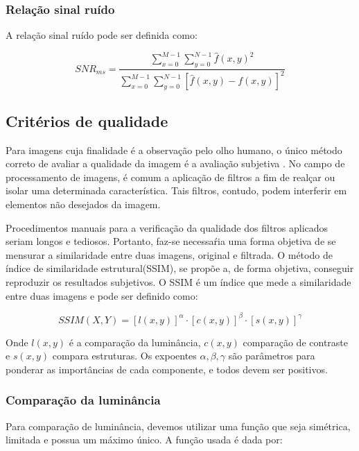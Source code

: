\documentclass[10pt,a4paper]{article}
\begin{document}
\subsubsection{Relação sinal ruído}
A relação sinal ruído pode ser definida como:

\begin{equation}
    SNR_{ms} =\frac{\sum_{x = 0}^{M - 1} \sum_{y = 0}^{N - 1} \hat{f}(x,y)^{2} }{\sum_{x = 0}^{M - 1} \sum_{y = 0}^{N - 1} [\hat{f}(x,y) - f(x,y)]^2}
    \label{eq:snr}
\end{equation}

\subsection{Critérios de qualidade}
Para imagens cuja finalidade é a observação pelo olho humano, o único método correto de avaliar a qualidade da imagem é a avaliação subjetiva \cite{article}. No campo de processamento de imagens, é comum a aplicação de filtros a fim de realçar ou isolar uma determinada característica. Tais filtros, contudo, podem interferir em elementos não desejados da imagem.

Procedimentos manuais para a verificação da qualidade dos filtros aplicados seriam longos e tediosos. Portanto, faz-se necessaŕia uma forma objetiva de se mensurar a similaridade entre duas imagens, original e filtrada. O método de índice de similaridade estrutural(SSIM), se propõe a, de forma objetiva, conseguir reproduzir os resultados subjetivos. O SSIM é um índice que mede a similaridade entre duas imagens e pode ser definido como:

\begin{equation}
    \mathit{SSIM}(X,Y) = [l(x,y)]^{\alpha} \cdot [c(x,y)]^{\beta} \cdot [s(x,y)]^{\gamma}
    \label{eq:ssim_trash}
\end{equation}

Onde $l(x,y)$ é a comparação da luminância, $c(x,y)$ comparação de contraste e $s(x,y)$ compara estruturas. Os expoentes $\alpha, \beta, \gamma$ são parâmetros para ponderar as importâncias de cada componente, e todos devem ser positivos.

\subsubsection*{Comparação da luminância}
Para comparação de luminância, devemos utilizar uma função que seja simétrica, limitada e possua um máximo único. A função usada é dada por:
\end{document}
